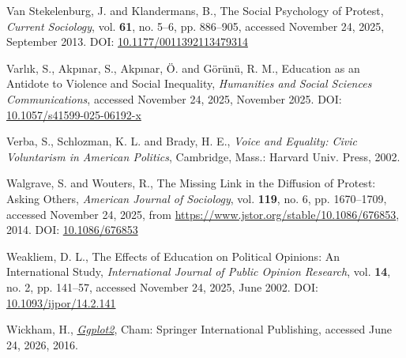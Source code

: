 \documentclass[
  13pt,
]{article}
\newlength{\cslhangindent}
\newenvironment{CSLReferences}[2] %
 {\begin{list}{}{%
  \setlength{\itemindent}{0pt}
  \setlength{\leftmargin}{0pt}
  \setlength{\parsep}{0pt}
  \ifodd #1
   \setlength{\leftmargin}{\cslhangindent}
   \setlength{\itemindent}{-1\cslhangindent}
  \fi
  \setlength{\itemsep}{#2\baselineskip}}}
 {\end{list}}
\begin{document}
\begin{CSLReferences}{1}{0}
Van Stekelenburg, J. and Klandermans, B., The Social Psychology of
Protest, \emph{Current Sociology}, vol. \textbf{61}, no. 5--6, pp.
886--905, accessed November 24, 2025, September 2013. DOI:
\href{https://doi.org/10.1177/0011392113479314}{10.1177/0011392113479314}

Varlık, S., Akpınar, S., Akpınar, Ö. and Görünü, R. M., Education as an
Antidote to Violence and Social Inequality, \emph{Humanities and Social
Sciences Communications}, accessed November 24, 2025, November 2025.
DOI:
\href{https://doi.org/10.1057/s41599-025-06192-x}{10.1057/s41599-025-06192-x}

Verba, S., Schlozman, K. L. and Brady, H. E., \emph{Voice and Equality:
Civic Voluntarism in {American} Politics}, Cambridge, Mass.: Harvard
Univ. Press, 2002.

Walgrave, S. and Wouters, R., The {Missing Link} in the {Diffusion} of
{Protest}: {Asking Others}, \emph{American Journal of Sociology}, vol.
\textbf{119}, no. 6, pp. 1670--1709, accessed November 24, 2025, from
\url{https://www.jstor.org/stable/10.1086/676853}, 2014. DOI:
\href{https://doi.org/10.1086/676853}{10.1086/676853}

Weakliem, D. L., The {Effects} of {Education} on {Political Opinions}:
{An International Study}, \emph{International Journal of Public Opinion
Research}, vol. \textbf{14}, no. 2, pp. 141--57, accessed November 24,
2025, June 2002. DOI:
\href{https://doi.org/10.1093/ijpor/14.2.141}{10.1093/ijpor/14.2.141}

Wickham, H.,
\emph{\href{https://doi.org/10.1007/978-3-319-24277-4}{Ggplot2}}, Cham:
Springer International Publishing, accessed June 24, 2026, 2016.

\end{CSLReferences}
\end{document}
